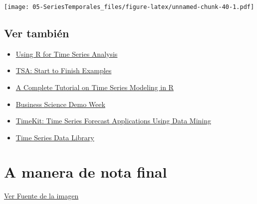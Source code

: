 \documentclass[]{book}
\newenvironment{Shaded}{\begin{snugshade}}{\end{snugshade}}
\newcommand{\DataTypeTok}[1]{\textcolor[rgb]{0.13,0.29,0.53}{#1}}
\newcommand{\DecValTok}[1]{\textcolor[rgb]{0.00,0.00,0.81}{#1}}
\newcommand{\KeywordTok}[1]{\textcolor[rgb]{0.13,0.29,0.53}{\textbf{#1}}}
\newcommand{\NormalTok}[1]{#1}
\newcommand{\OperatorTok}[1]{\textcolor[rgb]{0.81,0.36,0.00}{\textbf{#1}}}
\newcommand{\StringTok}[1]{\textcolor[rgb]{0.31,0.60,0.02}{#1}}
\begin{document}
\begin{Shaded}
\end{Shaded}

\texttt{[image: 05-SeriesTemporales\_files/figure-latex/unnamed-chunk-40-1.pdf]}

\hypertarget{ver-tambien-1}{%
\subsection{Ver también}\label{ver-tambien-1}}

\begin{itemize}
\item
  \href{http://a-little-book-of-r-for-time-series.readthedocs.io/en/latest/src/timeseries.html\#selecting-a-candidate-arima-model}{Using R for Time Series Analysis}
\item
  \href{https://rpubs.com/ryankelly/ts6}{TSA: Start to Finish Examples}
\item
  \href{https://www.analyticsvidhya.com/blog/2015/12/complete-tutorial-time-series-modeling/}{A Complete Tutorial on Time Series Modeling in R}
\item
  \href{http://www.business-science.io/code-tools/2017/10/23/demo_week_tidyquant.html}{Business Science Demo Week}
\item
  \href{http://www.business-science.io/code-tools/2017/05/02/timekit-0-2-0.html}{TimeKit: Time Series Forecast Applications Using Data Mining}
\item
  \href{https://datamarket.com/data/list/?q=provider:tsdl}{Time Series Data Library}
\end{itemize}

\hypertarget{a-manera-de-nota-final}{%
\section{A manera de nota final}\label{a-manera-de-nota-final}}

\href{http://berkeleysciencereview.com/how-to-become-a-data-scientist-before-you-graduate/}{Ver Fuente de la imagen}
\end{document}
